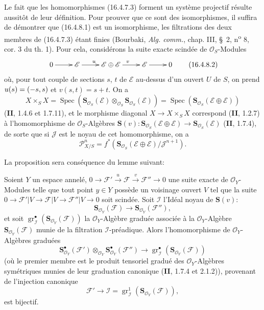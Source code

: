 Le fait que les homomorphismes (16.4.7.3) forment un système projectif résulte
aussitôt de leur définition. Pour prouver que ce sont des isomorphismes, il
suffira de
démontrer que (16.4.8.1) est un isomorphisme, les filtrations des deux membres de
(16.4.7.3) étant finies (Bourbaki, \emph{Alg. comm.}, chap. III, \S~2,
n\textsuperscript{o} 8, cor. 3 du th. 1). Pour cela, considérons la suite exacte
scindée de $\mathcal{O}_S$-Modules
\[
  \xymatrix{
    0 \ar[r] & \mathscr{E} \ar[r]^{u} &
    \mathscr{E}\oplus\mathscr{E} \ar[r]^{v} &
    \mathscr{E} \ar[r] & 0
  }
  \tag{16.4.8.2}
  \label{IV.16.4.8.2}
\]
où, pour tout couple de sections $s$, $t$ de $\mathscr{E}$ au-dessus d'un ouvert
$U$ de $S$, on prend $u(s)=(- s,s)$ et $v(s,t)=s+t$. On a
\[
  X\times_S X=\operatorname{Spec}
  (\mathbf{S}_{\mathcal{O}_S}(\mathscr{E})\otimes_{\mathcal{O}_S}
  \mathbf{S}_{\mathcal{O}_S}(\mathscr{E}))
  =\operatorname{Spec}(\mathbf{S}_{\mathcal{O}_S}
  (\mathscr{E}\oplus\mathscr{E}))
\]
(\textbf{II}, 1.4.6 et 1.7.11), et le morphisme diagonal $X\to X\times_S X$ correspond
(\textbf{II}, 1.2.7) à l'homomorphisme de $\mathcal{O}_S$-Algèbres
$\mathbf{S}(v):\mathbf{S}_{\mathcal{O}_S}(\mathscr{E}\oplus\mathscr{E})
\to\mathbf{S}_{\mathcal{O}_S}(\mathscr{E})$ (\textbf{II}, 1.7.4), de sorte que si
$\mathscr{J}$ est le noyau de cet homomorphisme, on a
\[
  \mathscr{P}_{X/S}^n=f^*(\mathbf{S}_{\mathcal{O}_S}
  (\mathscr{E}\oplus\mathscr{E})/\mathscr{J}^{n+1}).
\]

La proposition sera conséquence du lemme suivant:

\begin{lemma}[16.4.8.3]
\label{IV.16.4.8.3}
Soient $Y$ un espace annelé,
$0\to\mathscr{F}'\xrightarrow{u}\mathscr{F}\xrightarrow{v}\mathscr{F}''\to0$
une suite exacte de $\mathcal{O}_Y$-Modules telle que tout point $y\in Y$
possède un voisinage ouvert $V$ tel que la suite
$0\to\mathscr{F}'|V\to\mathscr{F}|V\to\mathscr{F}''|V\to0$ soit scindée.
Soit $\mathscr{I}$ l'Idéal noyau de
$\mathbf{S}(v)$:
\[
  \mathbf{S}_{\mathcal{O}_Y}(\mathscr{F})\to\mathbf{S}_{\mathcal{O}_Y}(\mathscr{F}''),
\]
et soit
$\operatorname{gr}_{\mathscr{I}}^\bullet
(\mathbf{S}_{\mathcal{O}_Y}(\mathscr{F}))$ la $\mathcal{O}_Y$-Algèbre graduée
associée à la $\mathcal{O}_Y$-Algèbre
$\mathbf{S}_{\mathcal{O}_Y}(\mathscr{F})$ \textup{munie de la filtration
$\mathscr{I}$-préadique}. Alors l'homomorphisme de $\mathcal{O}_Y$-Algèbres
graduées
\[
  \mathbf{S}_{\mathcal{O}_Y}^{\bullet}(\mathscr{F}')
  \otimes_{\mathcal{O}_Y}
  \mathbf{S}_{\mathcal{O}_Y}^{\bullet}(\mathscr{F}'')
  \longrightarrow
  \operatorname{gr}_{\mathscr{I}}^\bullet
  (\mathbf{S}_{\mathcal{O}_Y}(\mathscr{F}))
  \tag{16.4.8.4}
  \label{IV.16.4.8.4}
\]
(où le premier membre est le produit tensoriel gradué des
$\mathcal{O}_Y$-Algèbres symétriques munies de leur graduation canonique
\textup{(\textbf{II}, 1.7.4 et 2.1.2)}), provenant de l'injection canonique
\[
  \mathscr{F}'\longrightarrow\mathscr{I}
  =\operatorname{gr}_{\mathscr{I}}^1
  (\mathbf{S}_{\mathcal{O}_Y}(\mathscr{F})),
\]
est bijectif.
\end{lemma}

